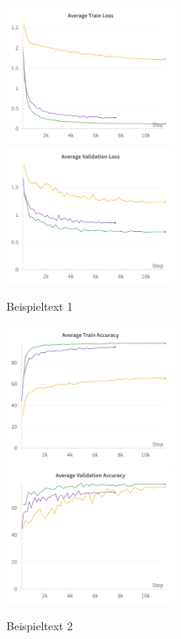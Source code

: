 \begin{figure}
	\centering
	\includegraphics[width=0.5\textwidth]{figure_results_supcon-lin_avg-train-loss.png}%
	\includegraphics[width=0.5\textwidth]{figure_results_supcon-lin_avg-val-loss.png}
	\caption{Beispieltext 1}
\end{figure}
\begin{figure}
	\centering
	\includegraphics[width=0.5\textwidth]{figure_results_supcon-lin_avg-train-acc.png}%
	\includegraphics[width=0.5\textwidth]{figure_results_supcon-lin_avg-val-acc.png}
	\caption{Beispieltext 2}
\end{figure}
